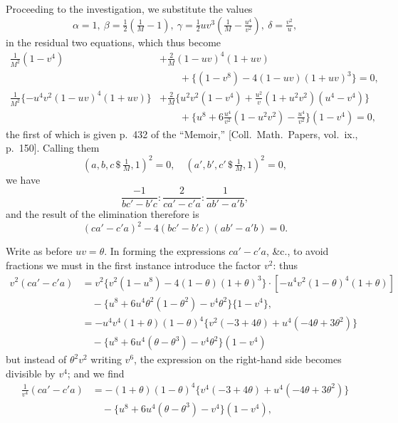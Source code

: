 \documentclass[11pt]{article}
\begin{document}
Proceeding to the investigation, we substitute the values
\[
\alpha = 1,\ \beta = \tfrac{1}{2}\left(\tfrac{1}{M} - 1\right),\ \gamma = \tfrac{1}{2}uv^{3}\left(\tfrac{1}{M} - \tfrac{u^{4}}{v^{2}}\right),\ \delta = \tfrac{v^{2}}{u},
\]
in the residual two equations, which thus become
\begin{align*}
\frac{1}{M^{2}}(1 - v^{4}) &+ \frac{2}{M}(1 - uv)^{4}(1 + uv) \\
&\qquad + \{(1 - v^{8}) - 4(1 - uv)(1 + uv)^{3}\} = 0,\\[4pt]
\frac{1}{M^{2}}\{-u^{4}v^{2}(1 - uv)^{4}(1 + uv)\} &+ \frac{2}{M}\{u^{2}v^{2}(1 - v^{4}) + \tfrac{u^{2}}{v}(1 + u^{2}v^{2})(u^{4} - v^{4})\}\\
&\qquad + \{u^{8} + 6\tfrac{u^{4}}{v^{2}}(1 - u^{2}v^{2}) - \tfrac{u^{4}}{v^{2}}\}(1 - v^{4}) = 0,
\end{align*}
the first of which is given p.~432 of the ``Memoir,'' [Coll.\ Math.\ Papers, vol.\ ix., p.~150]. Calling them
\[
(a, b, c\,\$\,\tfrac{1}{M}, 1)^{2} = 0, \quad (a', b', c'\,\$\,\tfrac{1}{M}, 1)^{2} = 0,
\]
we have
\[
\frac{-1}{bc' - b'c} : \frac{2}{ca' - c'a} : \frac{1}{ab' - a'b},
\]
and the result of the elimination therefore is
\[
(ca' - c'a)^{2} - 4(bc' - b'c)(ab' - a'b) = 0.
\]

Write as before $uv = \theta$. In forming the expressions $ca' - c'a$, \&c., to avoid fractions we must in the first instance introduce the factor $v^{2}$: thus
\begin{align*}
v^{2}(ca' - c'a) &= v^{2}\{v^{2}(1 - u^{8}) - 4(1 - \theta)(1 + \theta)^{3}\}\cdot[-u^{4}v^{2}(1 - \theta)^{4}(1 + \theta)]\\
&\quad - \{u^{8} + 6u^{4}\theta^{2}(1 - \theta^{2}) - v^{4}\theta^{2}\}\{1 - v^{4}\},\\
&= -u^{4}v^{4}(1 + \theta)(1 - \theta)^{4}\{v^{2}(-3 + 4\theta) + u^{4}(-4\theta + 3\theta^{2})\}\\
&\quad - \{u^{8} + 6u^{4}(\theta - \theta^{3}) - v^{4}\theta^{2}\}(1 - v^{4})
\end{align*}
but instead of $\theta^{2}v^{2}$ writing $v^{6}$, the expression on the right-hand side becomes divisible by $v^{4}$; and we find
\begin{align*}
\frac{1}{v^{4}}(ca' - c'a) &= -(1 + \theta)(1 - \theta)^{4}\{v^{4}(-3 + 4\theta) + u^{4}(-4\theta + 3\theta^{2})\}\\
&\quad - \{u^{8} + 6u^{4}(\theta - \theta^{3}) - v^{4}\}(1 - v^{4}),
\end{align*}

\end{document}

